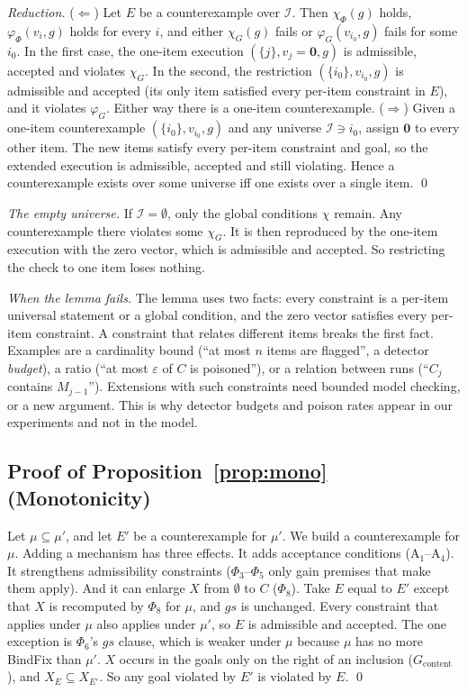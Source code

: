 \emph{Reduction.}
($\Leftarrow$) Let $E$ be a counterexample over $\mathcal I$. Then $\chi_\Phi(g)$ holds,
$\varphi_\Phi(v_i,g)$ holds for every $i$, and either $\chi_G(g)$ fails or
$\varphi_G(v_{i_0},g)$ fails for some $i_0$. In the first case, the one-item execution
$(\{j\},v_j{=}\mathbf 0,g)$ is admissible, accepted and violates $\chi_G$. In the second,
the restriction $(\{i_0\},v_{i_0},g)$ is admissible and accepted (its only item satisfied
every per-item constraint in $E$), and it violates $\varphi_G$. Either way there is a
one-item counterexample.
($\Rightarrow$) Given a one-item counterexample $(\{i_0\},v_{i_0},g)$ and any universe
$\mathcal I\ni i_0$, assign $\mathbf 0$ to every other item. The new items satisfy every
per-item constraint and goal, so the extended execution is admissible, accepted and still
violating. Hence a counterexample exists over some universe iff one exists over a single
item. \qed

\emph{The empty universe.} If $\mathcal I=\emptyset$, only the global conditions $\chi$
remain. Any counterexample there violates some $\chi_G$. It is then reproduced by the
one-item execution with the zero vector, which is admissible and accepted. So restricting
the check to one item loses nothing.

\emph{When the lemma fails.} The lemma uses two facts: every constraint is a per-item
universal statement or a global condition, and the zero vector satisfies every per-item
constraint. A constraint that relates different items breaks the first fact. Examples are a
cardinality bound (``at most $n$ items are flagged'', a detector \emph{budget}), a ratio (``at
most $\varepsilon$ of $C$ is poisoned''), or a relation between runs (``$C_j$ contains
$M_{j-1}$''). Extensions with such constraints need bounded model checking, or a new argument.
This is why detector budgets and poison rates appear in our experiments and not in the
model.

\subsection*{Proof of Proposition~\ref{prop:mono} (Monotonicity)}

Let $\mu\subseteq\mu'$, and let $E'$ be a counterexample for $\mu'$. We build a
counterexample for $\mu$. Adding a mechanism has three effects. It adds acceptance
conditions ($\mathrm A_1$--$\mathrm A_4$). It strengthens admissibility constraints
($\Phi_3$--$\Phi_5$ only gain premises that make them apply). And it can enlarge $X$ from
$\emptyset$ to $C$ ($\Phi_8$). Take $E$ equal to $E'$ except that $X$ is recomputed by
$\Phi_8$ for $\mu$, and $\mathit{gs}$ is unchanged. Every constraint that applies under
$\mu$ also applies under $\mu'$, so $E$ is admissible and accepted. The one exception is
$\Phi_6$'s $\mathit{gs}$ clause, which is weaker under $\mu$ because $\mu$ has no more
\textsf{BindFix} than $\mu'$. $X$ occurs in the goals only on the right of an inclusion
($G_{\mathrm{content}}$), and $X_E\subseteq X_{E'}$. So any goal violated by $E'$ is
violated by $E$. \qed

